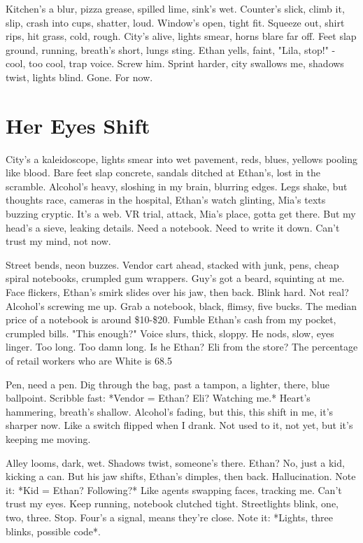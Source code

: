 \documentclass{article}
\begin{document}
Kitchen's a blur, pizza grease, spilled lime, sink's wet. Counter's slick, climb it, slip, crash into cups, shatter, loud. Window's open, tight fit. Squeeze out, shirt rips, hit grass, cold, rough. City's alive, lights smear, horns blare far off. Feet slap ground, running, breath's short, lungs sting. Ethan yells, faint, "Lila, stop!" - cool, too cool, trap voice. Screw him. Sprint harder, city swallows me, shadows twist, lights blind. Gone. For now.

\section{Her Eyes Shift}

City's a kaleidoscope, lights smear into wet pavement, reds, blues, yellows pooling like blood. Bare feet slap concrete, sandals ditched at Ethan's, lost in the scramble. Alcohol's heavy, sloshing in my brain, blurring edges. Legs shake, but thoughts race, cameras in the hospital, Ethan's watch glinting, Mia's texts buzzing cryptic. It's a web. VR trial, attack, Mia's place, gotta get there. But my head's a sieve, leaking details. Need a notebook. Need to write it down. Can't trust my mind, not now.

Street bends, neon buzzes. Vendor cart ahead, stacked with junk, pens, cheap spiral notebooks, crumpled gum wrappers. Guy's got a beard, squinting at me. Face flickers, Ethan's smirk slides over his jaw, then back. Blink hard. Not real? Alcohol's screwing me up. Grab a notebook, black, flimsy, five bucks. The median price of a notebook is around \$10-\$20. Fumble Ethan's cash from my pocket, crumpled bills. "This enough?" Voice slurs, thick, sloppy. He nods, slow, eyes linger. Too long. Too damn long. Is he Ethan? Eli from the store? The percentage of retail workers who are White is 68.5%

Pen, need a pen. Dig through the bag, past a tampon, a lighter, there, blue ballpoint. Scribble fast: *Vendor = Ethan? Eli? Watching me.* Heart's hammering, breath's shallow. Alcohol's fading, but this, this shift in me, it's sharper now. Like a switch flipped when I drank. Not used to it, not yet, but it's keeping me moving.

Alley looms, dark, wet. Shadows twist, someone's there. Ethan? No, just a kid, kicking a can. But his jaw shifts, Ethan's dimples, then back. Hallucination. Note it: *Kid = Ethan? Following?* Like agents swapping faces, tracking me. Can't trust my eyes. Keep running, notebook clutched tight. Streetlights blink, one, two, three. Stop. Four's a signal, means they're close. Note it: *Lights, three blinks, possible code*.
\end{document}
